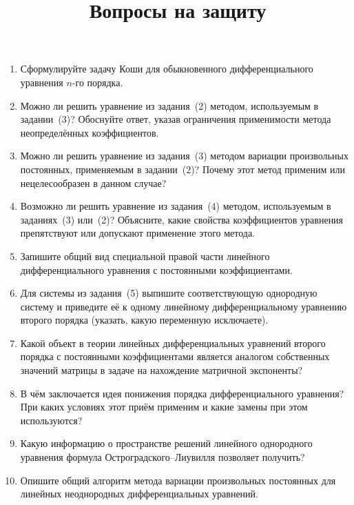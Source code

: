 \documentclass{article}
\title{Вопросы на защиту}
\author{}
\date{}
\begin{document}
\maketitle

\begin{enumerate}
\item Сформулируйте задачу Коши для обыкновенного дифференциального уравнения $n$-го порядка. 

\item Можно ли решить уравнение из задания~(2) методом, используемым в задании~(3)? Обоснуйте ответ, указав ограничения применимости метода неопределённых коэффициентов.

\item Можно ли решить уравнение из задания~(3) методом вариации произвольных постоянных, применяемым в задании~(2)? Почему этот метод применим или нецелесообразен в данном случае?

\item Возможно ли решить уравнение из задания~(4) методом, используемым в заданиях~(3) или~(2)? Объясните, какие свойства коэффициентов уравнения препятствуют или допускают применение этого метода.

\item Запишите общий вид специальной правой части линейного дифференциального уравнения с постоянными коэффициентами.

\item Для системы из задания~(5) выпишите соответствующую однородную систему и приведите её к одному линейному дифференциальному уравнению второго порядка (указать, какую переменную исключаете).

\item Какой объект в теории линейных дифференциальных уравнений второго порядка с постоянными коэффициентами является аналогом собственных значений матрицы в задаче на нахождение матричной экспоненты?

\item В чём заключается идея понижения порядка дифференциального уравнения? При каких условиях этот приём применим и какие замены при этом используются?

\item Какую информацию о пространстве решений линейного однородного уравнения формула Остроградского--Лиувилля позволяет получить?

\item Опишите общий алгоритм метода вариации произвольных постоянных для линейных неоднородных дифференциальных уравнений.
\end{enumerate}
\end{document}

